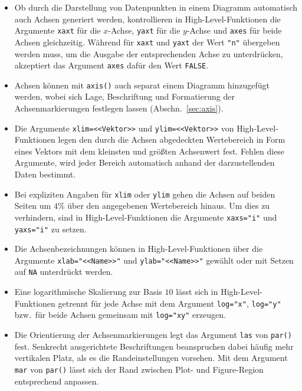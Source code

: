 \begin{itemize}
\item Ob durch die Darstellung von Datenpunkten in einem Diagramm automatisch auch Achsen generiert werden, kontrollieren in High-Level-Funktionen die Argumente \lstinline!xaxt! für die $x$-Achse, \lstinline!yaxt! für die $y$-Achse und \lstinline!axes! für beide Achsen gleichzeitig. Während für \lstinline!xaxt! und \lstinline!yaxt! der Wert \lstinline!"n"! übergeben werden muss, um die Ausgabe der entsprechenden Achse zu unterdrücken, akzeptiert das Argument \lstinline!axes! dafür den Wert \lstinline!FALSE!\@.

\item Achsen können mit \lstinline!axis()! auch separat einem Diagramm hinzugefügt werden, wobei sich Lage, Beschriftung und Formatierung der Achsenmarkierungen festlegen lassen (Abschn.\ \ref{sec:axis}).

\item Die Argumente \lstinline!xlim=<<Vektor>>! und \lstinline!ylim=<<Vektor>>! von High-Level-Funktionen legen den durch die Achsen abgedeckten Wertebereich in Form eines Vektors mit dem kleinsten und größten Achsenwert fest. Fehlen diese Argumente, wird jeder Bereich automatisch anhand der darzustellenden Daten bestimmt.

\item Bei expliziten Angaben für \lstinline!xlim! oder \lstinline!ylim! gehen die Achsen auf beiden Seiten um $4\%$ über den angegebenen Wertebereich hinaus. Um dies zu verhindern, sind in High-Level-Funktionen die Argumente \lstinline!xaxs="i"! und \lstinline!yaxs="i"! zu setzen.

\item Die Achsenbezeichnungen können in High-Level-Funktionen über die Argumente \lstinline!xlab="<<Name>>"! und \lstinline!ylab="<<Name>>"! gewählt oder mit Setzen auf \lstinline!NA! unterdrückt werden.

\item Eine logarithmische Skalierung zur Basis $10$ lässt sich in High-Level-Funktionen getrennt für jede Achse mit dem Argument \lstinline!log="x"!, \lstinline!log="y"! bzw.\ für beide Achsen gemeinsam mit \lstinline!log="xy"! erzeugen.

\item Die Orientierung der Achsenmarkierungen legt das Argument \lstinline!las! von \lstinline!par()! fest. Senkrecht ausgerichtete Beschriftungen beanspruchen dabei häufig mehr vertikalen Platz, als es die Randeinstellungen vorsehen. Mit dem Argument \lstinline!mar! von \lstinline!par()! lässt sich der Rand zwischen Plot- und Figure-Region entsprechend anpassen.
\end{itemize}


